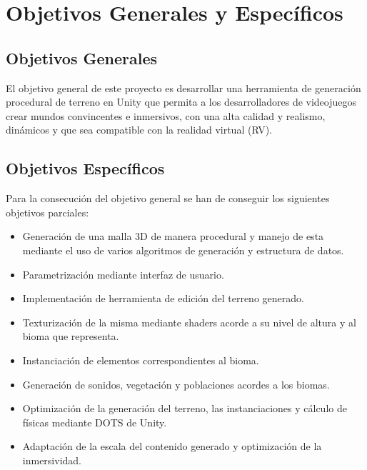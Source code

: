 

\section{Objetivos Generales y Específicos}

\subsection{Objetivos Generales}
El objetivo general de este proyecto es desarrollar una herramienta de generación procedural de terreno en Unity que permita a los desarrolladores de videojuegos crear mundos convincentes e inmersivos, con una alta calidad y realismo, dinámicos y que sea compatible con la realidad virtual (RV).

\subsection{Objetivos Específicos}
Para la consecución del objetivo general se han de conseguir los siguientes objetivos parciales:

\begin{itemize}
   \item Generación de una malla 3D de manera procedural y manejo de esta mediante el uso de varios algoritmos de generación y estructura de datos.
   \item Parametrización mediante interfaz de usuario.
   \item Implementación de herramienta de edición del terreno generado.
   \item Texturización de la misma mediante shaders acorde a su nivel de altura y al bioma que representa.
   \item Instanciación de elementos correspondientes al bioma.
   \item Generación de sonidos, vegetación y poblaciones acordes a los biomas.
   \item Optimización de la generación del terreno, las instanciaciones y cálculo de físicas mediante DOTS de Unity.
   \item Adaptación de la escala del contenido generado y optimización de la inmersividad.
\end{itemize}
\newpage

